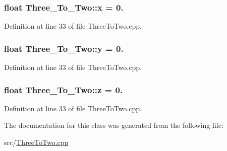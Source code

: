 \subsubsection[{\texorpdfstring{x}{x}}]{\setlength{\rightskip}{0pt plus 5cm}float Three\+\_\+\+To\+\_\+\+Two\+::x = 0.}\hypertarget{class_three___to___two_a62f60abbec70c062d40369bae26d8bfc}{}\label{class_three___to___two_a62f60abbec70c062d40369bae26d8bfc}


Definition at line 33 of file Three\+To\+Two.\+cpp.

\subsubsection[{\texorpdfstring{y}{y}}]{\setlength{\rightskip}{0pt plus 5cm}float Three\+\_\+\+To\+\_\+\+Two\+::y = 0.}\hypertarget{class_three___to___two_a74c72941752a52a87c13e4268ec37cc8}{}\label{class_three___to___two_a74c72941752a52a87c13e4268ec37cc8}


Definition at line 33 of file Three\+To\+Two.\+cpp.

\subsubsection[{\texorpdfstring{z}{z}}]{\setlength{\rightskip}{0pt plus 5cm}float Three\+\_\+\+To\+\_\+\+Two\+::z = 0.}\hypertarget{class_three___to___two_a2dc98edd9d60378c346b61e988f966f9}{}\label{class_three___to___two_a2dc98edd9d60378c346b61e988f966f9}


Definition at line 33 of file Three\+To\+Two.\+cpp.



The documentation for this class was generated from the following file\+:\begin{DoxyCompactItemize}
\item 
src/\hyperlink{_three_to_two_8cpp}{Three\+To\+Two.\+cpp}\end{DoxyCompactItemize}
